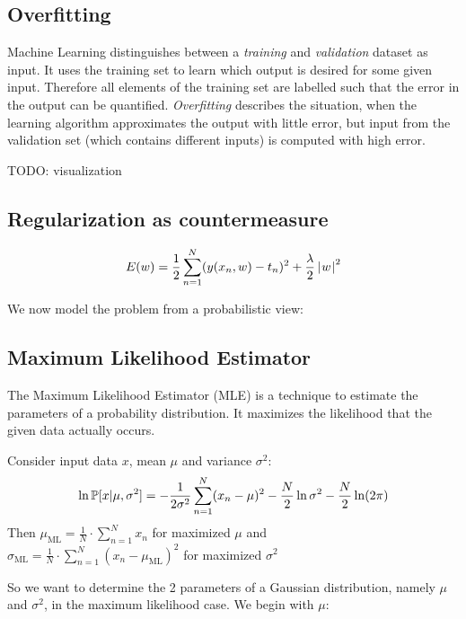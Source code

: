 \subsection{Overfitting}
\label{sec:bp-overfitting}
%
Machine Learning distinguishes between a \emph{training} and \emph{validation} dataset as input.
It uses the training set to learn which output is desired for some given input.
Therefore all elements of the training set are labelled such that the error in the output can be quantified.
\emph{Overfitting} describes the situation, when the learning algorithm approximates the output with little error,
but input from the validation set (which contains different inputs) is computed with high error.

TODO: visualization

\subsection{Regularization as countermeasure}
\[ E(w) = \frac12 \sum_{n=1}^N (y(x_n, w) - t_n)^2 + \frac{\lambda}{2} \left|\hspace{0.6999pt}w\hspace{0.6999pt}\right|^2 \]


We now model the problem from a probabilistic view:

\subsection{Maximum Likelihood Estimator}
%
%
The Maximum Likelihood Estimator (MLE) is a technique to estimate the parameters of a probability distribution.
It maximizes the likelihood that the given data actually occurs.

\begin{theorem}
  Consider input data $x$, mean $\mu$ and variance $\sigma^2$:
  \[ \ln{\mathbb P[x | \mu, \sigma^2]} = -\frac1{2\sigma^2} \sum_{n=1}^N (x_n - \mu)^2 - \frac{N}{2} \ln{\sigma^2} - \frac{N}{2} \ln(2\pi) \]
  Then
  $\mu_{\text{ML}} = \frac{1}{N} \cdot \sum_{n=1}^N x_n$ for maximized $\mu$ and \\
    $\sigma_{\text{ML}} = \frac{1}{N}\cdot \sum_{n=1}^N (x_n - \mu_{\text{ML}})^2$ for maximized $\sigma^2$
\end{theorem}

So we want to determine the 2 parameters of a Gaussian distribution, namely $\mu$ and $\sigma^2$, in the maximum likelihood case.
We begin with $\mu$:

